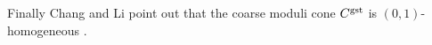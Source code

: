 \documentclass[11pt]{amsart}
\newcommand{\Mone}[3]{\overline{\pazocal M}^{(1)}_{#1}(#2,#3)}
\newcommand{\PP}{\mathbb P}
\renewcommand{\to}{\rightarrow}
\newcommand{\hC}{\widehat{\mathcal C}}
\newcommand{\tZ}{\widetilde{\pazocal Z}}
\newcommand{\tZp}{\widetilde{\pazocal Z}^p}
\newcommand{\R}{\operatorname{R}}
\newcommand{\Gm}{\mathbb{G}_{\rm{m}}}
\theoremstyle{plain}
\theoremstyle{definition}
\begin{document}
Finally Chang and Li point out that the coarse moduli cone $C^{\rm{gst}}$ is $(0,1)$-homogeneous \cite[Proposition 6.7]{CLpfields}.


 
\end{document}
